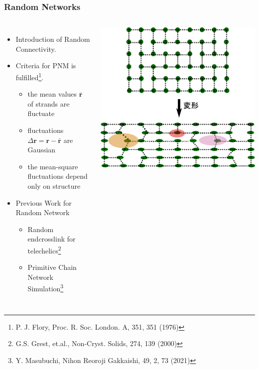 \documentclass[12pt, dvipdfmx]{beamer}
\begin{document}
\setcounter{footnote}{0}
\begin{frame}
	\frametitle{Random Networks}
		\begin{columns}[c, onlytextwidth]
			\begin{itemize}
				\item Introduction of \alert{Random Connectivity}.
					\item \alert{Criteria for PNM} is fulfilled\footnote{
								\scriptsize{P. J. Flory, Proc. R. Soc. London. A, 351, 351 (1976)}
						}.
					\begin{itemize}
						\item the mean values $\bar{\bm{r}}$ of strands are \alert{fluctuate}
						\item fluctuations $\Delta \bm{r} = \bm{r} - \bar{\bm{r}}$ are \alert{Gaussian}
						\item the mean-square fluctuations \alert{depend only on structure}
					\end{itemize}
				\item Previous Work for Random Network
				\begin{itemize}
					\item Random endcrosslink for telechelics\footnote{
						\scriptsize{G.S. Grest, et.al., Non-Cryst. Solids, 274, 139 (2000)}
						}
					\item Primitive Chain Network Simulation\footnote{
						\scriptsize{Y. Masubuchi, Nihon Reoroji Gakkaishi, 49, 2, 73 (2021)}
					}
				\end{itemize}
			\end{itemize}
				\centering
					\includegraphics[width=\textwidth]{random_NW.png}
		\end{columns}
\end{frame}
\end{document}
